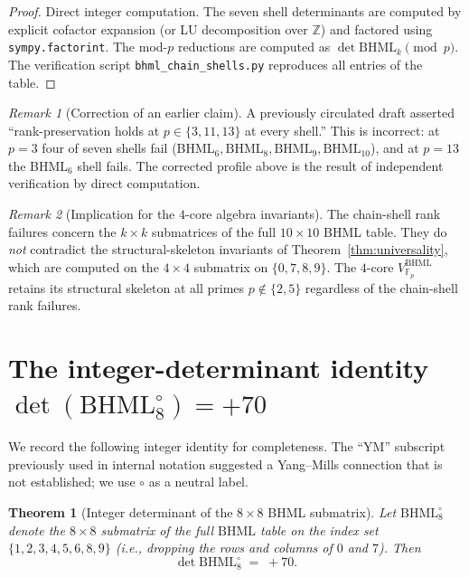 \documentclass[11pt,reqno]{amsart}
\theoremstyle{plain}
\newtheorem{theorem}{Theorem}[section]
\theoremstyle{definition}
\theoremstyle{remark}
\newtheorem*{remark}{Remark}
\newcommand{\Z}{\mathbb{Z}}
\newcommand{\F}{\mathbb{F}}
\newcommand{\BHML}{\mathrm{BHML}}
\begin{document}
\begin{proof}
Direct integer computation. The seven shell determinants are
computed by explicit cofactor expansion (or LU decomposition over
$\Z$) and factored using \texttt{sympy.factorint}. The mod-$p$
reductions are computed as $\det \BHML_{k} \pmod{p}$. The
verification script \texttt{bhml\_chain\_shells.py} reproduces all
entries of the table.
\end{proof}

\begin{remark}[Correction of an earlier claim]
A previously circulated draft asserted ``rank-preservation holds at
$p \in \{3, 11, 13\}$ at every shell.'' This is incorrect: at $p = 3$
four of seven shells fail (BHML$_{6}, \BHML_{8}, \BHML_{9}, \BHML_{10}$),
and at $p = 13$ the BHML$_{6}$ shell fails. The corrected profile
above is the result of independent verification by direct computation.
\end{remark}

\begin{remark}[Implication for the $4$-core algebra invariants]
The chain-shell rank failures concern the $k \times k$ submatrices
of the full $10 \times 10$ BHML table. They do \emph{not} contradict
the structural-skeleton invariants of Theorem~\ref{thm:universality},
which are computed on the $4 \times 4$ submatrix on
$\{0, 7, 8, 9\}$. The $4$-core $V^{\BHML}_{\F_{p}}$ retains its
structural skeleton at all primes $p \notin \{2, 5\}$ regardless of
the chain-shell rank failures.
\end{remark}

\section{The integer-determinant identity
$\det(\BHML_{8}^{\circ}) = +70$}
\label{sec:bhml8}

We record the following integer identity for completeness. The
``YM'' subscript previously used in internal notation suggested a
Yang--Mills connection that is not established; we use $\circ$ as a
neutral label.

\begin{theorem}[Integer determinant of the $8 \times 8$ BHML
submatrix]
\label{thm:bhml8ym}
Let $\BHML_{8}^{\circ}$ denote the $8 \times 8$ submatrix of the
full $\BHML$ table on the index set
$\{1, 2, 3, 4, 5, 6, 8, 9\}$ (i.e., dropping the rows and columns
of $0$ and $7$). Then
\[
\det \BHML_{8}^{\circ} \;=\; +70.
\]
\end{theorem}
\end{document}
